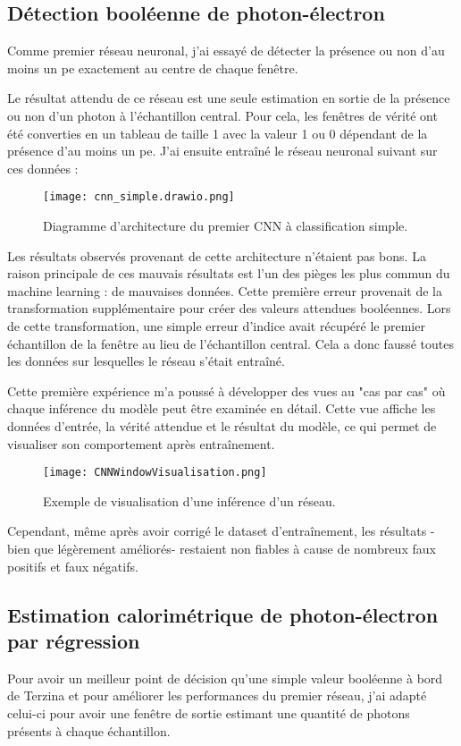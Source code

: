 \subsection{Détection booléenne de photon-électron}
Comme premier réseau neuronal, j'ai essayé de détecter la présence 
ou non d'au moins un \gls{pe} exactement au centre de chaque fenêtre.

Le résultat attendu de ce réseau est une seule estimation en sortie de la présence ou non d'un photon à l'échantillon central.
Pour cela, les fenêtres de vérité ont été converties en un tableau de taille 1 avec la valeur 1 ou 0 dépendant de la présence d'au moins un \gls{pe}.
J'ai ensuite entraîné le réseau neuronal suivant sur ces données : 
\begin{figure}[tbph!]
	\centering
	\texttt{[image: cnn\_simple.drawio.png]}
	\caption[Diagramme d'architecture du premier CNN à classification simple]{Diagramme d'architecture du premier CNN à classification simple.}
\end{figure}

Les résultats observés provenant de cette architecture n'étaient pas bons.
La raison principale de ces mauvais résultats est l'un des pièges les plus commun du machine learning : de mauvaises données.
Cette première erreur provenait de la transformation supplémentaire pour créer des valeurs attendues booléennes.
Lors de cette transformation, une simple erreur d'indice avait récupéré le premier échantillon de la fenêtre au lieu de l'échantillon central.
Cela a donc faussé toutes les données sur lesquelles le réseau s'était entraîné.

Cette première expérience m'a poussé à développer des vues au "cas par cas" où chaque inférence du modèle peut être examinée en détail.
Cette vue affiche les données d'entrée, la vérité attendue et le résultat du modèle, ce qui permet de visualiser son comportement après entraînement. 

\begin{figure}[tbph!]
	\centering
	\texttt{[image: CNNWindowVisualisation.png]}
	\caption[Exemple de visualisation d'une inférence d'un réseau]{Exemple de visualisation d'une inférence d'un réseau.}
\end{figure}

Cependant, même après avoir corrigé le dataset d'entraînement, les résultats -bien que légèrement améliorés- restaient non fiables à cause de nombreux
faux positifs et faux négatifs.

\subsection{Estimation calorimétrique de photon-électron par régression}
Pour avoir un meilleur point de décision qu'une simple valeur booléenne à bord de Terzina et pour améliorer les performances du premier réseau,
j'ai adapté celui-ci pour avoir une fenêtre de sortie estimant une quantité de photons présents à chaque échantillon.

